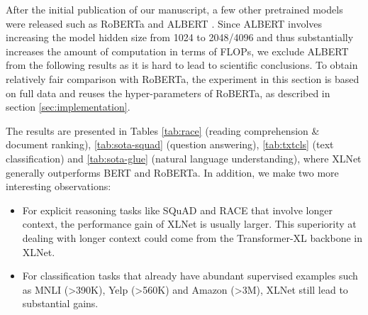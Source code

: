   

After the initial publication of our manuscript, a few other pretrained models were released such as RoBERTa \cite{liu2019roberta} and ALBERT \cite{lan2019albert}. Since ALBERT involves increasing the model hidden size from 1024 to 2048/4096 and thus substantially increases the amount of computation in terms of FLOPs, we exclude ALBERT from the following results as it is hard to lead to scientific conclusions. 
To obtain relatively fair comparison with RoBERTa, the experiment in this section is based on full data and reuses the hyper-parameters of RoBERTa, as described in section \ref{sec:implementation}.

The results are presented in Tables \ref{tab:race} (reading comprehension \& document ranking), \ref{tab:sota-squad} (question answering), \ref{tab:txtcls} (text classification) and \ref{tab:sota-glue} (natural language understanding), where XLNet generally outperforms BERT and RoBERTa.
In addition, we make two more interesting observations:
\begin{itemize}[leftmargin=*,itemsep=0em,topsep=0em]
	\item For explicit reasoning tasks like SQuAD and RACE that involve longer context, the performance gain of XLNet is usually larger. This superiority at dealing with longer context could come from the Transformer-XL backbone in XLNet.
	\item For classification tasks that already have abundant supervised examples such as MNLI (>390K), Yelp (>560K) and Amazon (>3M), XLNet still lead to substantial gains.
\end{itemize}


